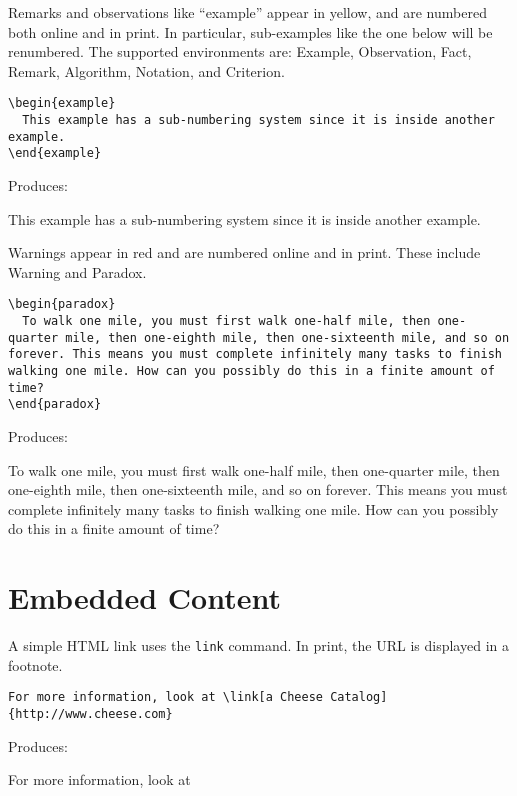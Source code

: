 \documentclass{ximera}
\begin{document}
\begin{example} Remarks and observations like ``example'' appear in yellow, and are numbered both online and in print. In particular, sub-examples like the one below will be renumbered. The supported environments are: Example, Observation, Fact, Remark, Algorithm, Notation, and Criterion.

\begin{verbatim}
\begin{example}
  This example has a sub-numbering system since it is inside another example.
\end{example}
\end{verbatim}

Produces:

\begin{example}
  This example has a sub-numbering system since it is inside another example.
\end{example}
\end{example}

\begin{example} Warnings appear in red and are numbered online and in print. These include Warning and Paradox.

\begin{verbatim}
\begin{paradox}
  To walk one mile, you must first walk one-half mile, then one-quarter mile, then one-eighth mile, then one-sixteenth mile, and so on forever. This means you must complete infinitely many tasks to finish walking one mile. How can you possibly do this in a finite amount of time?
\end{paradox}
\end{verbatim}

Produces:

\begin{paradox}
  To walk one mile, you must first walk one-half mile, then one-quarter mile, then one-eighth mile, then one-sixteenth mile, and so on forever. This means you must complete infinitely many tasks to finish walking one mile. How can you possibly do this in a finite amount of time?
\end{paradox}
\end{example}

\section{Embedded Content} \label{EmbeddedContent}

\begin{example} A simple HTML link uses the \verb!link! command. In print, the URL is displayed in a footnote.

\begin{verbatim}
For more information, look at \link[a Cheese Catalog]{http://www.cheese.com}
\end{verbatim}

Produces:

For more information, look at 
\end{example}
\end{document}
